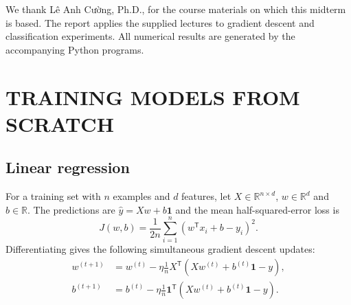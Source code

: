 

\shownumtrue{}\renewcommand{\pagesize}{12}
We thank Lê Anh Cường, Ph.D., for the course materials on which this midterm is based. The report applies the supplied lectures to gradient descent and classification experiments. All numerical results are generated by the accompanying Python programs.
\signblock\clearpage
\renewcommand{\pagesize}{13}
\chapter{TRAINING MODELS FROM SCRATCH}
\section{Linear regression}
For a training set with $n$ examples and $d$ features, let $X\in\mathbb{R}^{n\times d}$, $w\in\mathbb{R}^{d}$ and $b\in\mathbb{R}$. The predictions are $\hat y=Xw+b\mathbf{1}$ and the mean half-squared-error loss is
\[
J(w,b)=\frac{1}{2n}\sum_{i=1}^{n}(w^{\mathsf T}x_i+b-y_i)^2.
\]
Differentiating gives the following simultaneous gradient descent updates:
\[
\begin{aligned}
w^{(t+1)}&=w^{(t)}-\eta\frac{1}{n}X^{\mathsf T}(Xw^{(t)}+b^{(t)}\mathbf1-y),\\
b^{(t+1)}&=b^{(t)}-\eta\frac{1}{n}\mathbf1^{\mathsf T}(Xw^{(t)}+b^{(t)}\mathbf1-y).
\end{aligned}
\]

